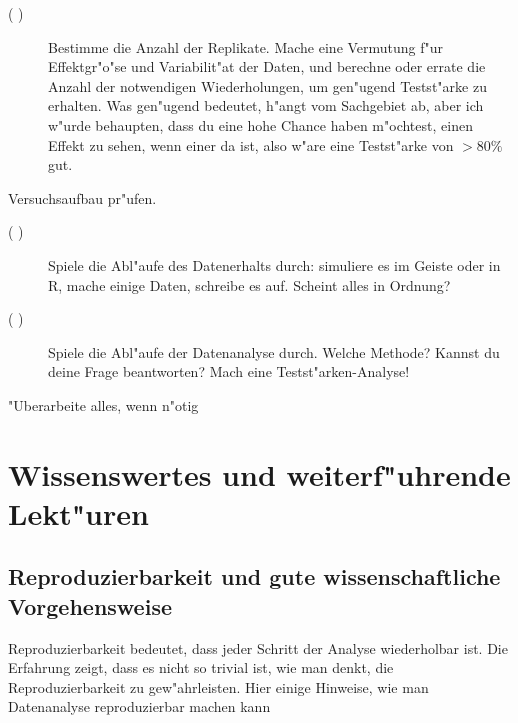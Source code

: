 \documentclass[a4paper,twoside]{tufte-book}\usepackage[]{graphicx}\usepackage[]{color}
\begin{document}
\begin{mdframed}
\begin{description}
\begin{description}
  \item[( )] Bestimme die Anzahl der Replikate. Mache eine Vermutung f"ur Effektgr"o"se und Variabilit"at der Daten, und berechne oder errate die Anzahl der notwendigen Wiederholungen, um gen"ugend Testst"arke zu erhalten. Was gen"ugend bedeutet, h"angt vom Sachgebiet ab, aber ich w"urde behaupten, dass du eine hohe Chance haben m"ochtest, einen Effekt zu sehen, wenn einer da ist, also w"are eine Testst"arke von $>80\%$ gut.
  
  \end{description}
  
\item[( )] Versuchsaufbau pr"ufen.
  
  \begin{description}
  
  \item[( )] Spiele die Abl"aufe des Datenerhalts durch: simuliere es im Geiste oder in R, mache einige Daten, schreibe es auf. Scheint alles in Ordnung?
  
  \item[( )] Spiele die Abl"aufe der Datenanalyse durch. Welche Methode? Kannst du deine Frage beantworten? Mach eine Testst"arken-Analyse!

  \end{description}


\item[( )] "Uberarbeite alles, wenn n"otig

\end{description}

\end{mdframed}


\chapter{Wissenswertes und weiterf"uhrende Lekt"uren}

\section{Reproduzierbarkeit und gute wissenschaftliche Vorgehensweise}

Reproduzierbarkeit bedeutet, dass jeder Schritt der Analyse wiederholbar ist. Die Erfahrung zeigt, dass es nicht so trivial ist, wie man denkt, die Reproduzierbarkeit zu gew"ahrleisten. Hier einige Hinweise, wie man Datenanalyse reproduzierbar machen kann
\end{document}
